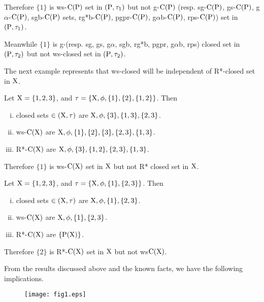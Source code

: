 \begin{exm}
Therefore $\{1\}$ is ws-$\mathrm{C}(\mathrm{P})$ set in $(\mathrm{P}, \tau_{1})$ but not g-$\mathrm{C}(\mathrm{P})$ (resp. sg-$\mathrm{C}(\mathrm{P})$, gs-$\mathrm{C}(\mathrm{P})$, g$\alpha$-$\mathrm{C}(\mathrm{P})$, sgb-$\mathrm{C}(\mathrm{P})$ sets, rg*b-$\mathrm{C}(\mathrm{P})$, pgpr-$\mathrm{C}(\mathrm{P})$, g$\alpha$b-$\mathrm{C}(\mathrm{P})$, rps-$\mathrm{C}(\mathrm{P})$) set in $(\mathrm{P}, \tau_{1})$.

Meanwhile $\{1\}$ is g-(resp. sg, gs, g$\alpha$, sgb, rg*b, pgpr, g$\alpha$b, rps) closed set in $(\mathrm{P}, \tau_{2})$ but not ws-closed set in $(\mathrm{P}, \tau_{2})$.
\end{exm}

\begin{rem}\label{rem2.1.4}
The next example represents that ws-closed will be independent of R*-closed set in $\mathrm{X}$.
\end{rem}

\begin{exm}\label{exm2.1.10}
Let $\mathrm{X}=\{1,2,3\}$, and $\tau=\{\mathrm{X},\phi,\{1\},\{2\},\{1,2\}\}$. Then
\begin{enumerate}[(i)]
\item closed sets $\in(\mathrm{X}, \tau)$ are $\mathrm{X}, \phi,\{3\},\{1, 3\},\{2, 3\}$.
\item ws-$\mathrm{C}(\mathrm{X})$ are $\mathrm{X}, \phi, \{1\},\{2\},\{3\},\{2, 3\}, \{1, 3\}$.
\item R*-$\mathrm{C}(\mathrm{X})$ are $\mathrm{X}, \phi,\{3\},\{1, 2\},\{2, 3\},\{1, 3\}$.
\end{enumerate}

Therefore $\{1\}$ is ws-$\mathrm{C}(\mathrm{X})$ set in $\mathrm{X}$ but not R* closed set in $\mathrm{X}$.
\end{exm}

\begin{exm}\label{exm2.1.11}
Let $\mathrm{X}=\{1,2,3\}$, and $\tau=\{\mathrm{X},\phi,\{1\},\{2,3\}\}$. Then
\begin{enumerate}[(i)]
\item closed sets $\in(\mathrm{X}, \tau)$ are $\mathrm{X}, \phi,\{1\},\{2, 3\}$.
\item ws-$\mathrm{C}(\mathrm{X})$ are $\mathrm{X}, \phi, \{1\},\{2, 3\}$.
\item R*-$\mathrm{C}(\mathrm{X})$ are $\{\mathrm{P}(\mathrm{X})\}$.
\end{enumerate}

Therefore $\{2\}$ is R*-$\mathrm{C}(\mathrm{X})$ set in $\mathrm{X}$ but not ws$\mathrm{C}(\mathrm{X})$.
\end{exm}

\begin{rem}\label{rem2.1.5}
From the results discussed above and the known facts, we have the following implications.

\begin{figure}[H]
\centering
\texttt{[image: fig1.eps]}
\end{figure}
\end{rem}

